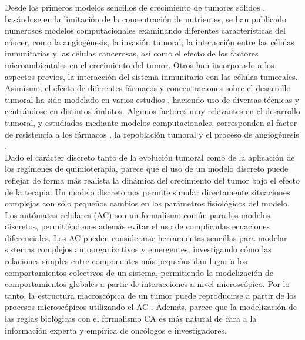 Desde los primeros modelos sencillos de crecimiento de tumores sólidos \cite{Burton1966}, basándose en la limitación de la concentración de nutrientes, se han publicado numerosos modelos computacionales \cite{Anderson1998, Bellouquid2013, Smolle1993, Sabzpoushan2018, Robertson2015} examinando diferentes características del cáncer, como la angiogénesis, la invasión tumoral, la interacción entre las células inmunitarias y las células cancerosas, así como el efecto de los factores microambientales en el crecimiento del tumor. Otros \cite{Byrne2006, Materi2007, Kuznetsov, Eikenberry2009, Eftimie2011, Rejniak2011, Marcu2012} han incorporado a los aspectos previos, la interacción del sistema inmunitario con las células tumorales. Asimismo, el efecto de diferentes fármacos y concentraciones sobre el desarrollo tumoral ha sido modelado en varios estudios \cite{Aroesty1973, Simeoni2004, Pillis2007, Pillis2008}, haciendo uso de diversas técnicas y centrándose en distintos ámbitos. Algunos factores muy relevantes  en el desarrollo tumoral, y estudiados mediante modelos computacionales, corresponden al factor de resistencia a los fármacos \cite{Marcu2004}, la repoblación tumoral \cite{Marcu2010} y el proceso de angiogénesis \cite{Wang2013}.\\

Dado el carácter discreto tanto de la evolución tumoral como de la aplicación de los regímenes de quimioterapia, parece que el uso de un modelo discreto puede reflejar de forma más realista la dinámica del crecimiento del tumor bajo el efecto de la terapia. Un modelo discreto nos permite simular directamente situaciones complejas con sólo pequeños cambios en los parámetros fisiológicos del modelo. Los autómatas celulares (AC) son un formalismo común para los modelos discretos, permitiéndonos además evitar el uso de complicadas ecuaciones diferenciales. Los AC pueden considerarse herramientas sencillas para modelar sistemas complejos autoorganizativos y emergentes, investigando cómo las relaciones simples entre componentes más pequeños dan lugar a los comportamientos colectivos de un sistema, permitiendo la modelización de comportamientos globales a partir de interacciones a nivel microscópico. Por lo tanto, la estructura macroscópica de un tumor puede reproducirse a partir de los procesos microscópicos utilizando el AC \cite{Mallet2006, Schmitz2002, Reis2009}. Además, parece que la modelización de las reglas biológicas con el formalismo CA es más natural de cara a la información experta y empírica de oncólogos e investigadores.\\


